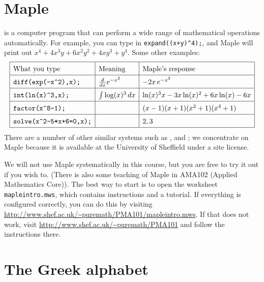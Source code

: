 \documentclass[a4paper]{book}
\theoremstyle{definition}
\begin{document}
\chapter{Maple}
\label{apx-maple}

 is a computer program that can perform a wide range of
mathematical operations automatically.  For example, you can type in
\verb!expand((x+y)^4);!, and Maple will print out
$x^4+4x^3y+6x^2y^2+4xy^3+y^4$.  Some other examples:
\[ \renewcommand{\arraystretch}{1.5} \begin{array}{|l|l|l|}
 \hline
 \text{What you type} & \text{Meaning} &
  \text{Maple's response} \\ \hline
 \verb!diff(exp(-x^2),x);! & \frac{d}{dx} e^{-x^2} &
  -2x\,e^{-x^2} \\ \hline
 \verb!int(ln(x)^3,x);! & \int \log(x)^3\,dx & 
  \ln(x)^3 x - 3x\ln(x)^2 + 6 x\ln(x) -6x \\ \hline
 \verb!factor(x^8-1);! && (x-1)(x+1)(x^2+1)(x^4+1) \\ \hline
 \verb!solve(x^2-5*x+6=0,x);! && 2,3  \\ \hline
\end{array} \]
There are a number of other similar systems such as
,  and ; we concentrate on
Maple because it is available at the University of Sheffield under a
site license.

We will not use Maple systematically in this course, but you are free
to try it out if you wish to.  (There is also some teaching of Maple
in AMA102 (Applied Mathematics Core)).  The best way to start is to
open the worksheet \verb+mapleintro.mws+, which contains instructions
and a tutorial.  If everything is configured correctly, you can do
this by visiting
\url{http://www.shef.ac.uk/~puremath/PMA101/mapleintro.mws}.  If that
does not work, visit \url{http://www.shef.ac.uk/~puremath/PMA101} and
follow the instructions there.

\chapter{The Greek alphabet}
\label{apx-greek}
\end{document}
